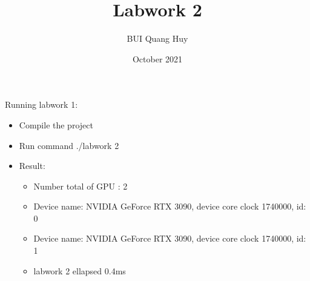\documentclass{article}
\title{Labwork 2}
\author{BUI Quang Huy}
\date{October 2021}
\begin{document}
\maketitle

Running labwork 1:
\begin{itemize}
    \item Compile the project
    \item Run command ./labwork 2
    \item Result:\begin{itemize}
        \item Number total of GPU : 2
        
        \item Device name: NVIDIA GeForce RTX 3090, device core clock 1740000, id: 0
        \item Device name: NVIDIA GeForce RTX 3090, device core clock 1740000, id: 1
        \item labwork 2 ellapsed 0.4ms
    \end{itemize}
\end{itemize}
\end{document}
